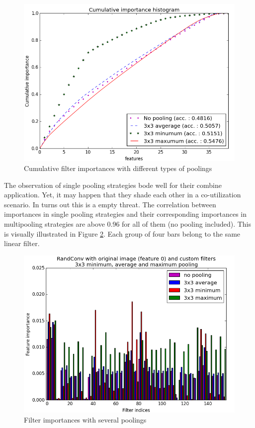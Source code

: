 \documentclass[a4paper]{report}
\begin{document}
	
	\begin{figure}
		\centering
			\includegraphics[width=1.0\textwidth]{images/FIPoolCumul.png}
		\caption{\label{fig:FIPoolCumul}Cumulative filter importances with different types of poolings}
	\end{figure}
	
	\par
	The observation of single pooling strategies bode well for their combine application. Yet, it may happen that they shade each other in a co-utilization scenario. In turns out this is a empty threat. The correlation between importances in single pooling strategies and their corresponding importances in multipooling strategies are above 0.96 for all of them (no pooling included). This is visually illustrated in Figure \ref{fig:FIPoolNoAvgMinMax}. Each group of four bars belong to the same linear filter. 
	
	\begin{figure}
		\centering
			\includegraphics[width=1.0\textwidth]{images/FIPoolNoAvgMinMax.png}
		\caption{\label{fig:FIPoolNoAvgMinMax}Filter importances with several poolings}
	\end{figure}
	
\end{document}
